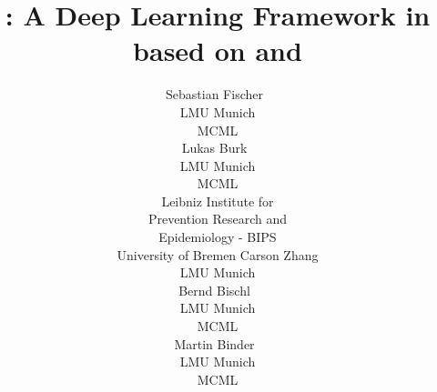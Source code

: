 \documentclass[article]{jss}
\author{Sebastian Fischer~\orcidlink{0000-0002-9609-3197} \\
    LMU Munich \\
    MCML \\
    \And Lukas Burk~\orcidlink{0000-0001-7528-3795} \\
    LMU Munich \\ MCML \\
    Leibniz Institute for\\Prevention Research and\\Epidemiology - BIPS \\
    University of Bremen
    \AND Carson Zhang \\
    LMU Munich \\
    \And Bernd Bischl~\orcidlink{0000-0001-6002-6980} \\
    LMU Munich \\
    MCML \\
    \And Martin Binder~\orcidlink{0009-0008-2578-2869} \\
    LMU Munich \\
    MCML \\
}
\title{\mlrttorch{}: A Deep Learning Framework in \rlang{} based on \mlrt{} and \torch{}}
\theoremstyle{definition}
\begin{document}
\begin{comment}

Done:
\begin{itemize}
  \item [x] Ensure consistent <- over =
  \item [x] max 30 pages (not a strict requirement). We are sightly above this limit, so should be fine
  \item [x] use \top instead of $^T$
  \item [x] For referring to subsections, do not use Subsection x.y, just Section x.y.
  \item [x] All captions should appear below the corresponding figure/table.
  \item [x] Abkürzungen konsistent verwenden: DL, ML, NLP etc.
  \item [x] Use \code{...} instead of \texttt{...} for inline code
  \item [x] Cite all datasets
  \item [x] use proglang everywhere
      * [x] Rust
      * [x] Go
      * [x] Python
      * [x] R
      * [x] C++
      * [x] Julia
  \item [ ] use pkg everywhere
      * [x] " mlr3"
      * [x] " torch "
  \item [x] never use (\cite{...}). (use \citep{} for that)
  \item [x] \title in title style
  \item [x] Do not use additional formatting for specific words unless explicitly required by the JSS style guide, e.g., --> remove emph and textit etc.
  \item [x] No comments in Code, this information should be presented in the normal latex text
  \item [x] In order to use markup in section headers, you can use: \section[Calling C++ from R]{Calling \proglang{C++} from \rlang{}}
  \item [x] To refer to equations, one can use either Equation~\ref{...} (with capitalization) or (\ref{...}) with the former being preferred if the number of equation references is not too large.
  \item [x] The captions should be in sentence style and end with a period. No additional formatting (such as \emph, \bf or \it) should be used for the caption.
  \item [x] All table row/column headers should also be in sentence style. There should not be further footnote-style annotations in tables; these should all be placed in the caption.

\end{comment}
\end{document}
